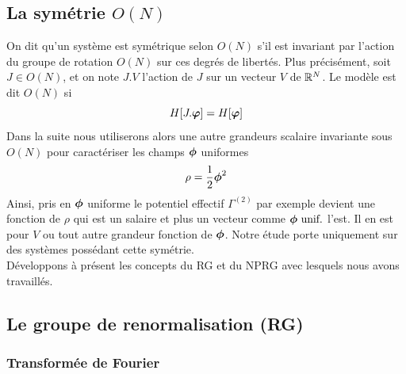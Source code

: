\documentclass[10pt]{article}
\begin{document}
\begin{multicols}{2}
\subsection{La symétrie $O(N)$}

On dit qu'un système est symétrique selon $O(N)$ s'il est invariant par l'action du groupe de rotation $O(N)$ sur ces degrés de libertés. Plus précisément, soit $J \in O(N)$, et on note $J.V$ l'action de $J$ sur un vecteur $V$ de $\mathbb{R}^N$. Le modèle est dit $O(N)$ si 
\begin{equation}
	H[J .\boldsymbol{ \varphi}] = H[\boldsymbol{ \varphi}]	
\end{equation}
Dans la suite nous utiliserons alors une autre grandeurs scalaire invariante sous $O(N)$ pour caractériser les champs $\boldsymbol{ \phi}$ uniformes 
\begin{equation}
	\rho = \frac{1}{2}  \boldsymbol{ \phi}^2  
\end{equation}
Ainsi, pris en $\boldsymbol{ \phi}$ uniforme le potentiel effectif $\Gamma^{(2)}$ par exemple devient une fonction de $\rho$ qui est un salaire et plus un vecteur comme $\boldsymbol{ \phi} \text{ unif.}$ l'est. Il en est pour $V$ ou tout autre grandeur fonction de $\boldsymbol{ \phi}$. Notre étude porte uniquement sur des systèmes possédant cette symétrie.\\

Développons à présent les concepts du RG et du NPRG avec lesquels nous avons travaillés.



\vspace*{11pt}
\subsection{Le groupe de renormalisation (RG)}


\subsubsection{Transformée de Fourier}

\label{sec:TF}


\end{multicols}
\end{document}
